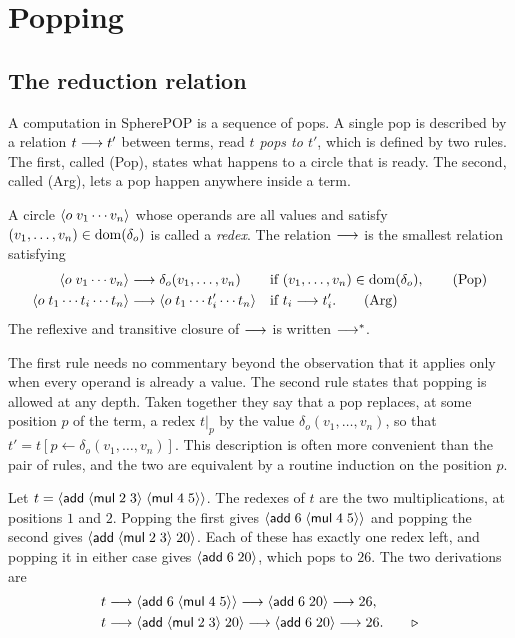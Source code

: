 \chapter{Popping}
\label{ch:popping}

\section{The reduction relation}

A computation in SpherePOP is a sequence of pops. A single pop is described by a relation $t\longrightarrow t'$ between terms, read \emph{$t$ pops to $t'$}, which is defined by two rules. The first, called (Pop), states what happens to a circle that is ready. The second, called (Arg), lets a pop happen anywhere inside a term.

\begin{definition}[Popping]\label{def:pop}
A circle $\langle o\; v_1\cdots v_n\rangle$ whose operands are all values and satisfy $(v_1,\dots,v_n)\in\operatorname{dom}(\delta_o)$ is called a \emph{redex}. The relation $\longrightarrow$ is the smallest relation satisfying
\begin{align}
\langle o\; v_1\cdots v_n\rangle &\longrightarrow \delta_o(v_1,\dots,v_n) &&\text{if }(v_1,\dots,v_n)\in\operatorname{dom}(\delta_o), \tag{Pop}\\
\langle o\; t_1\cdots t_i\cdots t_n\rangle &\longrightarrow \langle o\; t_1\cdots t_i'\cdots t_n\rangle &&\text{if } t_i\longrightarrow t_i'. \tag{Arg}
\end{align}
The reflexive and transitive closure of $\longrightarrow$ is written $\longrightarrow^{*}$.
\end{definition}

The first rule needs no commentary beyond the observation that it applies only when every operand is already a value. The second rule states that popping is allowed at any depth. Taken together they say that a pop replaces, at some position $p$ of the term, a redex $t|_p$ by the value $\delta_o(v_1,\dots,v_n)$, so that $t' = t[p\leftarrow\delta_o(v_1,\dots,v_n)]$. This description is often more convenient than the pair of rules, and the two are equivalent by a routine induction on the position $p$.

\begin{example}\label{ex:trace}
Let $t=\langle \mathsf{add}\; \langle \mathsf{mul}\; 2\; 3\rangle\; \langle \mathsf{mul}\; 4\; 5\rangle\rangle$. The redexes of $t$ are the two multiplications, at positions $1$ and $2$. Popping the first gives $\langle \mathsf{add}\; 6\; \langle \mathsf{mul}\; 4\; 5\rangle\rangle$ and popping the second gives $\langle \mathsf{add}\; \langle \mathsf{mul}\; 2\; 3\rangle\; 20\rangle$. Each of these has exactly one redex left, and popping it in either case gives $\langle \mathsf{add}\; 6\; 20\rangle$, which pops to $26$. The two derivations are
\begin{align*}
t &\longrightarrow \langle \mathsf{add}\; 6\; \langle \mathsf{mul}\; 4\; 5\rangle\rangle \longrightarrow \langle \mathsf{add}\; 6\; 20\rangle \longrightarrow 26,\\
t &\longrightarrow \langle \mathsf{add}\; \langle \mathsf{mul}\; 2\; 3\rangle\; 20\rangle \longrightarrow \langle \mathsf{add}\; 6\; 20\rangle \longrightarrow 26. \tag*{$\triangleright$}
\end{align*}
\end{example}

